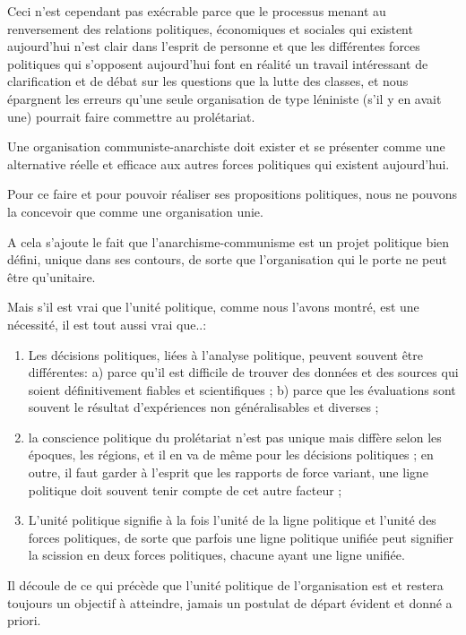 Ceci n'est cependant pas exécrable parce que le processus menant au renversement des relations politiques, économiques et sociales qui existent aujourd'hui n'est clair dans l'esprit de personne et que les différentes forces politiques qui s'opposent aujourd'hui font en réalité un travail intéressant de clarification et de débat sur les questions que la lutte des classes, et nous épargnent les erreurs qu'une seule organisation de type léniniste (s'il y en avait une) pourrait faire commettre au prolétariat.

Une organisation communiste-anarchiste doit exister et se présenter comme une alternative réelle et efficace aux autres forces politiques qui existent aujourd'hui.

Pour ce faire et pour pouvoir réaliser ses propositions politiques, nous ne pouvons la concevoir que comme une organisation unie.

A cela s'ajoute le fait que l'anarchisme-communisme est un projet politique bien défini, unique dans ses contours, de sorte que l'organisation qui le porte ne peut être qu'unitaire.

Mais s'il est vrai que l'unité politique, comme nous l'avons montré, est une nécessité, il est tout aussi vrai que..:

\begin{enumerate}
\item{} Les décisions politiques, liées à l'analyse politique, peuvent souvent être différentes: a) parce qu'il est difficile de trouver des données et des sources qui soient définitivement fiables et scientifiques ; b) parce que les évaluations sont souvent le résultat d'expériences non généralisables et diverses ;
\item{} la conscience politique du prolétariat n'est pas unique mais diffère selon les époques, les régions, et il en va de même pour les décisions politiques ; en outre, il faut garder à l'esprit que les rapports de force variant, une ligne politique doit souvent tenir compte de cet autre facteur ;
\item{} L'unité politique signifie à la fois l'unité de la ligne politique et l'unité des forces politiques, de sorte que parfois une ligne politique unifiée peut signifier la scission en deux forces politiques, chacune ayant une ligne unifiée.
\end{enumerate}

Il découle de ce qui précède que l'unité politique de l'organisation est et restera toujours un objectif à atteindre, jamais un postulat de départ évident et donné a priori.

